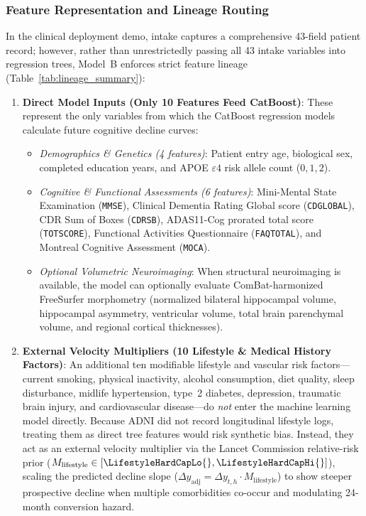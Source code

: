 \subsubsection{Feature Representation and Lineage Routing}
In the clinical deployment demo, intake captures a comprehensive 43-field patient record; however, rather than unrestrictedly passing all 43 intake variables into regression trees, Model~B enforces strict feature lineage (Table~\ref{tab:lineage_summary}):
\begin{enumerate}
    \item \textbf{Direct Model Inputs (Only 10 Features Feed CatBoost)}: These represent the only variables from which the CatBoost regression models calculate future cognitive decline curves:
    \begin{itemize}
        \item \textit{Demographics \& Genetics (4 features)}: Patient entry age, biological sex, completed education years, and APOE $\varepsilon4$ risk allele count ($0, 1, 2$).
        \item \textit{Cognitive \& Functional Assessments (6 features)}: Mini-Mental State Examination (\texttt{MMSE}), Clinical Dementia Rating Global score (\texttt{CDGLOBAL}), CDR Sum of Boxes (\texttt{CDRSB}), ADAS11-Cog prorated total score (\texttt{TOTSCORE}), Functional Activities Questionnaire (\texttt{FAQTOTAL}), and Montreal Cognitive Assessment (\texttt{MOCA}).
        \item \textit{Optional Volumetric Neuroimaging}: When structural neuroimaging is available, the model can optionally evaluate ComBat-harmonized FreeSurfer morphometry (normalized bilateral hippocampal volume, hippocampal asymmetry, ventricular volume, total brain parenchymal volume, and regional cortical thicknesses).
    \end{itemize}
    \item \textbf{External Velocity Multipliers (10 Lifestyle \& Medical History Factors)}: An additional ten modifiable lifestyle and vascular risk factors—current smoking, physical inactivity, alcohol consumption, diet quality, sleep disturbance, midlife hypertension, type~2 diabetes, depression, traumatic brain injury, and cardiovascular disease—do \textit{not} enter the machine learning model directly. Because ADNI did not record longitudinal lifestyle logs, treating them as direct tree features would risk synthetic bias. Instead, they act as an external velocity multiplier via the Lancet Commission relative-risk prior ($M_{\text{lifestyle}} \in [\LifestyleHardCapLo{}, \LifestyleHardCapHi{}]$), scaling the predicted decline slope ($\Delta y_{\text{adj}} = \Delta y_{t,h} \cdot M_{\text{lifestyle}}$) to show steeper prospective decline when multiple comorbidities co-occur and modulating 24-month conversion hazard.

\end{enumerate}
